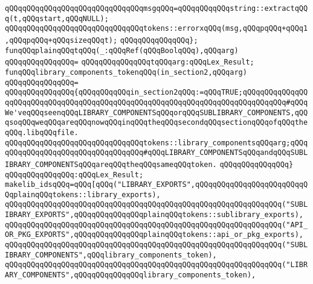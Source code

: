 \verb|qQQqqQQqqQQqqQQqqQQqqQQqqQQqqQQqmsgqQQq=qQQqqQQqqQQqstring::extractqQQq(t,qQQqstart,qQQqNULL);|\newline
\newline
\verb|qQQqqQQqqQQqqQQqqQQqqQQqqQQqqQQqtokens::errorxqQQq(msg,qQQqpqQQq+qQQq1,qQQqpqQQq+qQQqsizeqQQqt);|\newline
\verb|qQQqqQQqqQQqqQQq};|\newline
\newline
\verb|funqQQqplainqQQqtqQQq(_:qQQqRef(qQQqBoolqQQq),qQQqarg)|\newline
\verb|qQQqqQQqqQQqqQQq=|\newline
\verb|qQQqqQQqqQQqqQQqtqQQqarg:qQQqLex_Result;|\newline
\newline
\verb|funqQQqlibrary_components_tokenqQQq(in_section2,qQQqarg)|\newline
\verb|qQQqqQQqqQQqqQQq=|\newline
\verb|qQQqqQQqqQQqqQQq{qQQqqQQqqQQqin_section2qQQq:=qQQqTRUE;qQQqqQQqqQQqqQQqqQQqqQQqqQQqqQQqqQQqqQQqqQQqqQQqqQQqqQQqqQQqqQQqqQQqqQQqqQQqqQQq#qQQqWe'veqQQqseenqQQqLIBRARY_COMPONENTSqQQqorqQQqSUBLIBRARY_COMPONENTS,qQQqsoqQQqweqQQqareqQQqnowqQQqinqQQqtheqQQqsecondqQQqsectionqQQqofqQQqtheqQQq.libqQQqfile.|\newline
\verb|qQQqqQQqqQQqqQQqqQQqqQQqqQQqqQQqtokens::library_componentsqQQqarg;qQQqqQQqqQQqqQQqqQQqqQQqqQQqqQQqqQQq#qQQqLIBRARY_COMPONENTSqQQqandqQQqSUBLIBRARY_COMPONENTSqQQqareqQQqtheqQQqsameqQQqtoken.|\newline
\verb|qQQqqQQqqQQqqQQq}|\newline
\verb|qQQqqQQqqQQqqQQq:qQQqLex_Result;|\newline
\newline
\verb|makelib_idsqQQq=qQQq[qQQq("LIBRARY_EXPORTS",qQQqqQQqqQQqqQQqqQQqqQQqqQQqplainqQQqtokens::library_exports),|\newline
\verb|qQQqqQQqqQQqqQQqqQQqqQQqqQQqqQQqqQQqqQQqqQQqqQQqqQQqqQQqqQQqqQQq("SUBLIBRARY_EXPORTS",qQQqqQQqqQQqqQQqplainqQQqtokens::sublibrary_exports),|\newline
\verb|qQQqqQQqqQQqqQQqqQQqqQQqqQQqqQQqqQQqqQQqqQQqqQQqqQQqqQQqqQQqqQQq("API_OR_PKG_EXPORTS",qQQqqQQqqQQqqQQqplainqQQqtokens::api_or_pkg_exports),|\newline
\verb|qQQqqQQqqQQqqQQqqQQqqQQqqQQqqQQqqQQqqQQqqQQqqQQqqQQqqQQqqQQqqQQq("SUBLIBRARY_COMPONENTS",qQQqlibrary_components_token),|\newline
\verb|qQQqqQQqqQQqqQQqqQQqqQQqqQQqqQQqqQQqqQQqqQQqqQQqqQQqqQQqqQQqqQQq("LIBRARY_COMPONENTS",qQQqqQQqqQQqqQQqlibrary_components_token),|\newline
